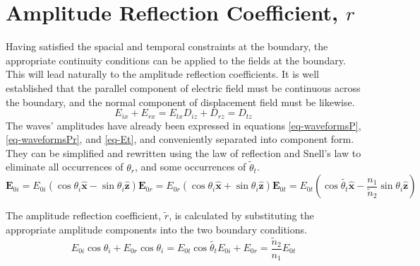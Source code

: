 \documentclass[12pt]{uthesis-v12}
\begin{document}
\section{Amplitude Reflection Coefficient, $r$}\label{planeWaves-r}
Having satisfied the spacial and temporal constraints at the boundary, the appropriate continuity conditions can be applied to the fields at the boundary. This will lead naturally to the amplitude reflection coefficients. It is well established that the parallel component of electric field must be continuous across the boundary, and the normal component of displacement field must be likewise\cite{Jackson}.
\begin{subequations}\label{eq-boundaryConditions}
\begin{equation}
E_{ix}+E_{rx}=E_{tx}
\end{equation}
\begin{equation}
D_{iz}+D_{rz}=D_{tz}
\end{equation}
\end{subequations}
The waves' amplitudes have already been expressed in equations \ref{eq-waveformsP}, \ref{eq-waveformsPr}, and \ref{eq-Et}, and conveniently separated into component form. They can be simplified and rewritten using the law of reflection and Snell's law to eliminate all occurrences of $\theta_r$, and some occurrences of $\tilde{\theta}_t$.
\begin{subequations}\label{eq-amplitudesP}
\begin{equation}
\mathbf{E}_{0i}=E_{0i}(\cos\theta_i\mathbf{\hat{x}}-\sin\theta_i\mathbf{\hat{z}})
\end{equation}
\begin{equation}
\mathbf{E}_{0r}=E_{0r}(\cos\theta_i\mathbf{\hat{x}}+\sin\theta_i\mathbf{\hat{z}})
\end{equation}
\begin{equation}
\mathbf{E}_{0t}=E_{0t}(\cos\tilde{\theta_t}\mathbf{\hat{x}}-\frac{n_1}{\tilde{n}_2}\sin\theta_i\mathbf{\hat{z}})
\end{equation}
\end{subequations}

The amplitude reflection coefficient, $\tilde{r}$, is calculated by substituting the appropriate amplitude components into the two boundary conditions.
\begin{subequations}\label{eq-boundaryConditionsSubstitutedP}
\begin{equation}
E_{0i}\cos\theta_i+E_{0r}\cos\theta_i=E_{0t}\cos\tilde{\theta_t}
\end{equation}
\begin{equation}
E_{0i}+E_{0r}=\frac{\tilde{n}_2}{n_1}E_{0t}
\end{equation}
\end{subequations}
\end{document}
